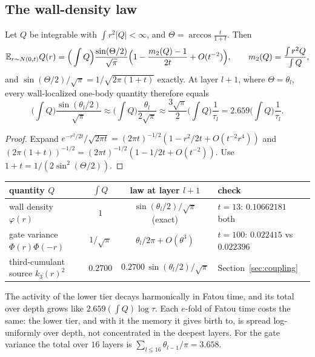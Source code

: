 \subsection{The wall-density law}
\begin{theorem}\label{thm:walldensity}
Let $Q$ be integrable with $\int r^2|Q|<\infty$, and $\Theta=\arccos\frac t{1+t}$. Then
\[
\mathbb E_{r\sim N(0,t)}Q(r)=\Big(\int Q\Big)\frac{\sin(\Theta/2)}{\sqrt\pi}\Big(1-\frac{m_2(Q)-1}{2t}+O(t^{-2})\Big),\qquad m_2(Q)=\frac{\int r^2Q}{\int Q},
\]
and $\sin(\Theta/2)/\sqrt\pi=1/\sqrt{2\pi(1+t)}$ exactly. At layer $l+1$, where $\Theta=\theta_l$, every wall-localized one-body quantity therefore equals
\[
\Big(\int Q\Big)\frac{\sin(\theta_l/2)}{\sqrt\pi}\approx\Big(\int Q\Big)\frac{\theta_l}{2\sqrt\pi}\approx\frac{3\sqrt\pi}2\Big(\int Q\Big)\frac1{\tau_l}=2.659\Big(\int Q\Big)\frac1{\tau_l}.
\]
\end{theorem}
\begin{proof}
Expand $e^{-r^2/2t}/\sqrt{2\pi t}=(2\pi t)^{-1/2}(1-r^2/2t+O(t^{-2}r^4))$ and $(2\pi(1+t))^{-1/2}=(2\pi t)^{-1/2}(1-1/2t+O(t^{-2}))$. Use
$1+t=1/(2\sin^2(\Theta/2))$.
\end{proof}
\begin{center}\small
\begin{tabular}{lccl}\toprule
quantity $Q$ & $\int Q$ & law at layer $l+1$ & check\\\midrule
wall density $\varphi(r)$ & $1$ & $\sin(\theta_l/2)/\sqrt\pi$ (exact) & $t=13$: $0.10662181$ both\\
gate variance $\Phi(r)\Phi(-r)$ & $1/\sqrt\pi$ & $\theta_l/2\pi+O(\theta^3)$ & $t=100$: $0.022415$ vs $0.022396$\\
third-cumulant source $k_3(r)^2$ & $0.2700$ & $0.2700\,\sin(\theta_l/2)/\sqrt\pi$ & Section~\ref{sec:coupling}\\\bottomrule
\end{tabular}
\end{center}
\begin{corollary}\label{cor:budget}
The activity of the lower tier decays harmonically in Fatou time, and its total over depth grows like $2.659(\int Q)\log\tau$. Each
$e$-fold of Fatou time costs the same: the lower tier, and with it the memory it gives birth to, is spread log-uniformly over depth,
not concentrated in the deepest layers. For the gate variance the total over $16$ layers is $\sum_{l\le16}\theta_{l-1}/\pi=3.658$.
\end{corollary}

